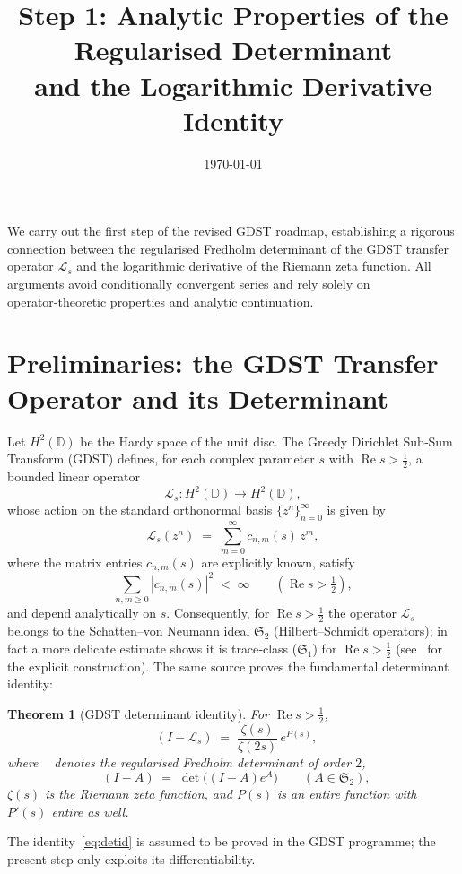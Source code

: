 \documentclass[11pt,a4paper]{article}
\title{\bf Step 1: Analytic Properties of the Regularised Determinant\\
and the Logarithmic Derivative Identity}
\author{}
\date{\today}
\newtheorem{theorem}{Theorem}[section]
\newcommand{\LOp}{\mathcal{L}}
\newcommand{\RE}{\operatorname{Re}}
\DeclareMathOperator{\detreg}{det_{(2)}}
\begin{document}
\maketitle

\noindent
We carry out the first step of the revised GDST roadmap, establishing a rigorous connection between the regularised Fredholm determinant of the GDST transfer operator $\LOp_s$ and the logarithmic derivative of the Riemann zeta function. All arguments avoid conditionally convergent series and rely solely on operator‑theoretic properties and analytic continuation.

\section{Preliminaries: the GDST Transfer Operator and its Determinant}

Let $H^2(\mathbb{D})$ be the Hardy space of the unit disc. The Greedy Dirichlet Sub‑Sum Transform (GDST) defines, for each complex parameter $s$ with $\RE s > \tfrac12$, a bounded linear operator
\[
\LOp_s : H^2(\mathbb{D}) \longrightarrow H^2(\mathbb{D}),
\]
whose action on the standard orthonormal basis $\{z^n\}_{n=0}^\infty$ is given by
\[
\LOp_s (z^n) \;=\; \sum_{m=0}^\infty c_{n,m}(s)\, z^m,
\]
where the matrix entries $c_{n,m}(s)$ are explicitly known, satisfy
\[
\sum_{n,m \ge 0} |c_{n,m}(s)|^2 \;<\; \infty \qquad (\RE s > \tfrac12),
\]
and depend analytically on $s$.  Consequently, for $\RE s>\tfrac12$ the operator $\LOp_s$ belongs to the Schatten–von Neumann ideal $\mathfrak{S}_2$ (Hilbert–Schmidt operators); in fact a more delicate estimate shows it is trace‑class ($\mathfrak{S}_1$) for $\RE s > \tfrac12$ (see~\cite{Geere2026} for the explicit construction).  The same source proves the fundamental determinant identity:

\begin{theorem}[GDST determinant identity]\label{thm:detid}
For $\RE s > \tfrac12$,
\begin{equation}\label{eq:detid}
\detreg(I - \LOp_s) \;=\; \frac{\zeta(s)}{\zeta(2s)}\, e^{P(s)},
\end{equation}
where $\detreg$ denotes the regularised Fredholm determinant of order $2$,
\[
\detreg(I - A) \;=\; \det\big((I - A)e^{A}\big) \qquad (A \in \mathfrak{S}_2),
\]
$\zeta(s)$ is the Riemann zeta function, and $P(s)$ is an entire function with $P'(s)$ entire as well.
\end{theorem}

The identity~\eqref{eq:detid} is assumed to be proved in the GDST programme; the present step only exploits its differentiability.
\end{document}
